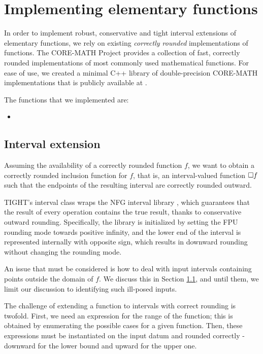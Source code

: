 
\section{Implementing elementary functions}
\label{sec:functions}
In order to implement robust, conservative and tight interval extensions of elementary functions, we rely on existing \emph{correctly rounded} implementations of functions.
The CORE-MATH Project \cite{Sibidanov2022} provides a collection of fast, correctly rounded implementations of most commonly used mathematical functions.
For ease of use, we created a minimal C++ library of double-precision CORE-MATH implementations that is publicly available at \url{}.

The functions that we implemented are:
\begin{itemize}
	\item
\end{itemize}

\subsection{Interval extension}
Assuming the availability of a correctly rounded function $f$, we want to obtain a correctly rounded inclusion function for $f$, that is, an interval-valued function $\Box f$ such that the endpoints of the resulting interval are correctly rounded outward.

TIGHT's interval class wraps the NFG interval library \cite{nfg}, which guarantees that the result of every operation contains the true result, thanks to conservative outward rounding. Specifically, the library is initialized by setting the FPU rounding mode towards positive infinity, and the lower end of the interval is represented internally with opposite sign, which results in downward rounding without changing the rounding mode.

An issue that must be considered is how to deal with input intervals containing points outside the domain of $f$. We discuss this in Section \ref{}, and until them, we limit our discussion to identifying such ill-posed inputs.

The challenge of extending a function to intervals with correct rounding is twofold.
First, we need an expression for the range of the function; this is obtained by enumerating the possible cases for a given function.
Then, these expressions must be instantiated on the input datum and rounded correctly - downward for the lower bound and upward for the upper one.

